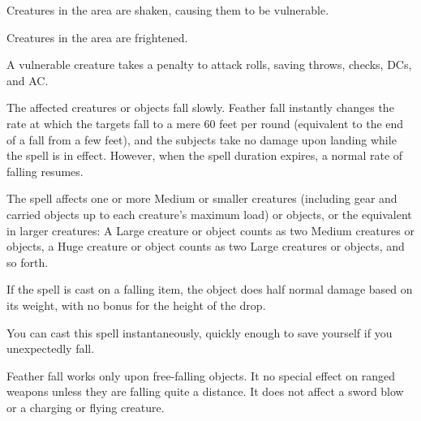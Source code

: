 \begin{spellhealthy}
  Creatures in the area are shaken, causing them to be vulnerable.
\end{spellhealthy}
\begin{spellblood}
  Creatures in the area are frightened.
\end{spellblood}
\begin{spellnotes}
  A vulnerable creature takes a  penalty to attack rolls, saving throws, checks, DCs, and AC.
\end{spellnotes}

\spellrng{\rngmed}
\begin{spelleffect}
  The affected creatures or objects fall slowly. Feather fall instantly changes the rate at which the targets fall to a mere 60 feet per round (equivalent to the end of a fall from a few feet), and the subjects take no damage upon landing while the spell is in effect. However, when the spell duration expires, a normal rate of falling resumes.
  \par The spell affects one or more Medium or smaller creatures (including gear and carried objects up to each creature's maximum load) or objects, or the equivalent in larger creatures: A Large creature or object counts as two Medium creatures or objects, a Huge creature or object counts as two Large creatures or objects, and so forth.
  \par If the spell is cast on a falling item, the object does half normal damage based on its weight, with no bonus for the height of the drop.
\end{spelleffect}
\begin{spellnotes}
  You can cast this spell instantaneously, quickly enough to save yourself if you unexpectedly fall. 
  \par Feather fall works only upon free-falling objects. It no special effect on ranged weapons unless they are falling quite a distance. It does not affect a sword blow or a charging or flying creature.
\end{spellnotes}

